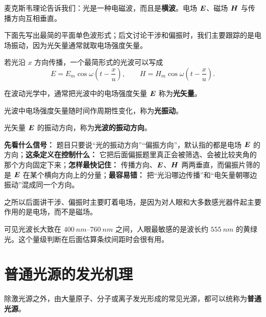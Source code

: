 \documentclass[lang=cn,11pt]{elegantbook}
\begin{document}
麦克斯韦理论告诉我们：光是一种电磁波，而且是\textbf{横波}。电场 \(\vb*{E}\)、磁场 \(\vb*{H}\) 与传播方向互相垂直。

下面先写出最简的平面单色波形式；后文讨论干涉和偏振时，我们主要跟踪的是电场振动，因为光矢量通常就取电场强度矢量。

若光沿 \(x\) 方向传播，一个最简形式的光波可以写成
\[
E=E_m\cos\omega\left(t-\frac{x}{u}\right),\qquad
H=H_m\cos\omega\left(t-\frac{x}{u}\right).
\]

\begin{definition}[光矢量]
在波动光学中，通常把光波中的电场强度矢量 \(\vb*{E}\) 称为\textbf{光矢量}。
\end{definition}

\begin{definition}[光振动]
光波中电场强度矢量随时间作周期性变化，称为\textbf{光振动}。
\end{definition}

\begin{definition}[光波的振动方向]
光矢量 \(\vb*{E}\) 的振动方向，称为\textbf{光波的振动方向}。
\end{definition}

\begin{note}
\textbf{先看什么信号：} 题目只要说“光的振动方向”“偏振方向”，默认指的都是电场 \(\vb*{E}\) 的方向；\textbf{这条定义在控制什么：} 它把后面偏振题里真正会被筛选、会被比较夹角的那个方向固定下来；\textbf{怎样最快记住：} 传播方向、\(\vb*{E}\)、\(\vb*{H}\) 两两垂直，而偏振片筛的是 \(\vb*{E}\) 在某个横向方向上的分量；\textbf{最容易错：} 把“光沿哪边传播”和“电矢量朝哪边振动”混成同一个方向。
\end{note}

\begin{note}
之所以后面讲干涉、偏振时主要盯着电场，是因为对人眼和大多数感光器件起主要作用的是电场，而不是磁场。
\end{note}

\begin{remark}
可见光波长大致在 \(\SIrange{400}{760}{nm}\) 之间，人眼最敏感的是波长约 \(\SI{555}{nm}\) 的黄绿光。这个量级判断在后面估算条纹间距时会很有用。
\end{remark}

\section{普通光源的发光机理}

\begin{definition}[普通光源]
除激光源之外，由大量原子、分子或离子发光形成的常见光源，都可以统称为\textbf{普通光源}。
\end{definition}
\end{document}
